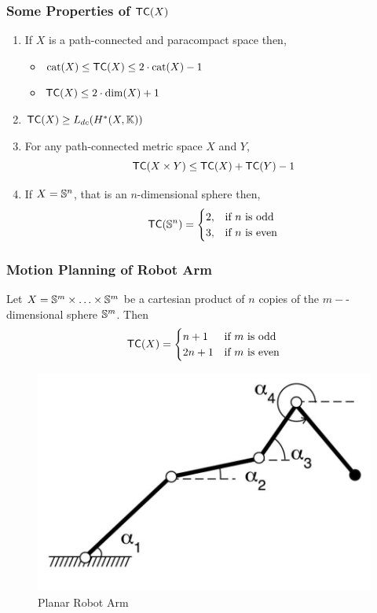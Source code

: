 \documentclass{beamer}
\begin{document}
\begin{frame}
    \frametitle{Some Properties of $\textsf{TC}(X)$}
    \begin{enumerate}
        \item If $X$ is a path-connected and paracompact space then,
              \begin{itemize}
                  \item \(
                        \operatorname{cat}(X) \le \textsf{TC}(X) \le 2 \cdot \operatorname{cat}(X) - 1
                        \)
                  \item $\textsf{TC}(X) \le 2 \cdot \dim(X) + 1$
              \end{itemize}
        \item $\textsf{TC}(X) \ge L_{dc}(H^*(X, \mathbb{K}))$
        \item For any path-connected metric space $X$ and $Y$,
              \[
                  \textsf{TC}(X \times Y) \le \textsf{TC}(X) + \textsf{TC}(Y) - 1
              \]
        \item If $X = \mathbb{S}^n$, that is an $n$-dimensional sphere then,
              \[
                  \textsf{TC}(\mathbb{S}^n) = \begin{cases}
                      2, & \text{if $n$ is odd}  \\
                      3, & \text{if $n$ is even} \\
                  \end{cases}
              \]
    \end{enumerate}

\end{frame}

\begin{frame}
    \frametitle{Motion Planning of Robot Arm}
    \begin{thm}[Farber, 2003]
        Let $X  = \mathbb{S}^m \times \ldots \times \mathbb{S}^m$ be a cartesian product of $n$ copies of the $m-$-dimensional sphere $\mathbb{S}^m$. Then
        \[
            \textsf{TC}(X) = \begin{cases}
                n + 1  & \text{if $m$ is odd}  \\
                2n + 1 & \text{if $m$ is even}
            \end{cases}
        \]
        \begin{figure}[h]
            \centering
            \includegraphics[scale=0.25]{../images/planar-robot-arm.png}
            \caption{Planar Robot Arm}
        \end{figure}
    \end{thm}
\end{frame}
\end{document}
